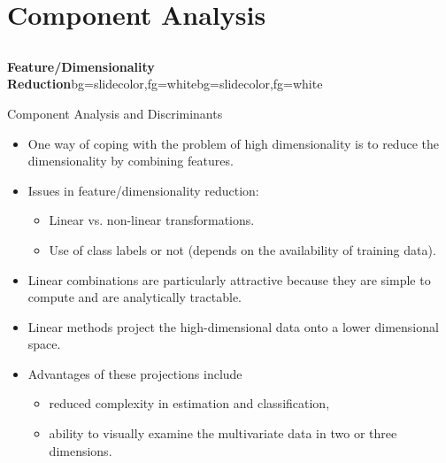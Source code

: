 \section{Component Analysis}
\subsection{}
\begin{frame}{}
\begin{variableblock}{\centering \Large \textbf{\vspace{4pt}\newline Feature/Dimensionality Reduction\vspace{4pt}}}{bg=slidecolor,fg=white}{bg=slidecolor,fg=white}
\end{variableblock}
\end{frame}

\begin{frame}{Component Analysis and Discriminants}
\begin{itemize}
\item One way of coping with the problem of high dimensionality
is to reduce the dimensionality by combining features.
\item Issues in feature/dimensionality reduction:
\begin{itemize}
\item Linear vs. non-linear transformations.
\item Use of class labels or not (depends on the availability of
training data).
\end{itemize}
\item Linear combinations are particularly attractive because they
are simple to compute and are analytically tractable.
\item Linear methods project the high-dimensional data onto a
lower dimensional space.
\item Advantages of these projections include
\begin{itemize}
\item reduced complexity in estimation and classification,
\item ability to visually examine the multivariate data in two or three dimensions.
\end{itemize}
\end{itemize}
\end{frame}

